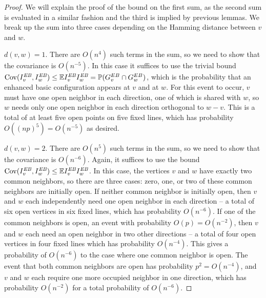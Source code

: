 \documentclass{amsart}
\newcommand{\E}[0]{\mathbb{E}}
\newcommand{\vect}[1]{{ #1}}
\newcommand{\Cov}{\operatorname{Cov}}
\newcommand{\prob}{\mathbb{P}}
\newcommand{\EB}{I^{\text{\em EB}}}
\newcommand{\event}{G}
\numberwithin{equation}{section}
\theoremstyle{definition}
\theoremstyle{remark}
\begin{document}
\begin{proof}
We will explain the proof of the bound on the first sum, as the second sum is evaluated in a similar fashion and the third is implied by previous lemmas.  We break up the sum into three cases depending on the Hamming distance between $\vect{v}$ and $\vect{w}$.

 $d(\vect{v},\vect{w})=1$.  There are $O(n^4)$ such terms in the sum, so we need to show that the covariance is $O(n^{-5})$.  In this case it suffices to use the trivial bound $\Cov(\EB_{\vect{v}},\EB_{\vect{w}}) \leq \E\EB_{\vect{v}}\EB_{\vect{w}} = \prob(\event_v^{EB}\cap \event_w^{EB})$, which is the probability that an enhanced basic configuration appears at $\vect{v}$ and at $\vect{w}$.  For this event to occur, $\vect{v}$ must have one open neighbor in each direction, one of which is shared with $\vect{w}$, so $\vect{w}$ needs only one open neighbor in each direction orthogonal to $\vect{w}-\vect{v}$.  This is a total of at least five open points on five fixed lines, which has probability $O((np)^5) = O(n^{-5})$ as desired.

 $d(\vect{v},\vect{w}) =2$.  There are $O(n^{5})$ such terms in the sum, so we need to show that the covariance is $O(n^{-6})$.  Again, it suffices to use the bound $\Cov(\EB_{\vect{v}},\EB_{\vect{w}}) \leq \E\EB_{\vect{v}}\EB_{\vect{w}}$.  In this case, the vertices $\vect{v}$ and $\vect{w}$ have exactly two common neighbors, so there are three cases: zero, one, or two of these common neighbors are initially open.  If neither common neighbor is initially open, then $\vect{v}$ and $\vect{w}$ each independently need one open neighbor in each direction -- a total of six open vertices in six fixed lines, which has probability $O(n^{-6})$.  If one of the common neighbors is open, an event with probability $O(p) = O(n^{-2})$, then $\vect{v}$ and $\vect{w}$ each need an open neighbor in two other directions -- a total of four open vertices in four fixed lines which has probability $O(n^{-4})$.  This gives a probability of $O(n^{-6})$ to the case where one common neighbor is open.  The event that both common neighbors are open has probability $p^2 = O(n^{-4})$, and $\vect{v}$ and $\vect{w}$ each require one more occupied neighbor in one direction, which has probability $O(n^{-2})$ for a total probability of $O(n^{-6})$.


\end{proof}
\end{document}

